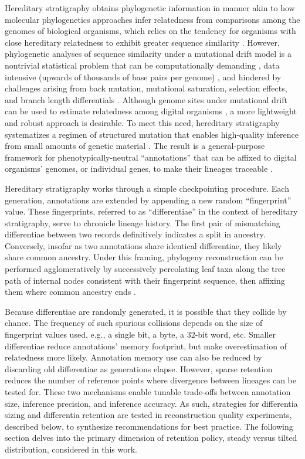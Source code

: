 Hereditary stratigraphy obtains phylogenetic information in manner akin to how molecular phylogenetics approaches infer relatedness from comparisons among the genomes of biological organisms, which relies on the tendency for organisms with close hereditary relatedness to exhibit greater sequence similarity \citep{yang2012molecular}.
However, phylogenetic analyses of sequence similarity under a mutational drift model is a nontrivial statistical problem \citep{neyman1971molecular} that can be computationally demanding \citep{konno2022deep,stamatakis2013novel}, data intensive (upwards of thousands of base pairs per genome) \citep{parks2009increasing,cloutier2019whole,wortley2005much}, and hindered by challenges arising from back mutation, mutational saturation, selection effects, and branch length differentials \citep{brocchieri2001phylogenetic,moreira2000molecular}.
Although genome sites under mutational drift can be used to estimate relatedness among digital organisms \citep{moreno2021case}, a more lightweight and robust approach is desirable.
To meet this need, hereditary stratigraphy systematizes a regimen of structured mutation that enables high-quality inference from small amounts of genetic material \citep{moreno2022hereditary}.
The result is a general-purpose framework for phenotypically-neutral ``annotations'' that can be affixed to digital organisms' genomes, or individual genes, to make their lineages traceable \citep{moreno2022hstrat}.

Hereditary stratigraphy works through a simple checkpointing procedure.
Each generation, annotations are extended by appending a new random ``fingerprint'' value.
These fingerprints, referred to as ``differentiae'' in the context of hereditary stratigraphy, serve to chronicle lineage history.
The first pair of mismatching differentiae between two records definitively indicates a split in ancestry.
Conversely, insofar as two annotations share identical differentiae, they likely share common ancestry.
Under this framing, phylogeny reconstruction can be performed agglomeratively by successively percolating leaf taxa along the tree path of internal nodes consistent with their fingerprint sequence, then affixing them where common ancestry ends \citep{moreno2024analysis}.

Because differentiae are randomly generated, it is possible that they collide by chance.
The frequency of such spurious collisions depends on the size of fingerprint values used, e.g., a single bit, a byte, a 32-bit word, etc.
Smaller differentiae reduce annotations' memory footprint, but make overestimation of relatedness more likely.
Annotation memory use can also be reduced by discarding old differentiae as generations elapse.
However, sparse retention reduces the number of reference points where divergence between lineages can be tested for.
These two mechanisms enable tunable trade-offs between annotation size, inference precision, and inference accuracy.
As such, strategies for differentia sizing and differentia retention are tested in reconstruction quality experiments, described below, to synthesize recommendations for best practice.
The following section delves into the primary dimension of retention policy, steady versus tilted distribution, considered in this work.

